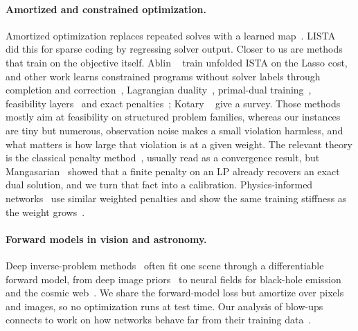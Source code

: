 \paragraph{Amortized and constrained optimization.}
Amortized optimization replaces repeated solves with a learned map~\cite{amos2023tutorial}. LISTA~\cite{gregor2010lista} did this for sparse coding by regressing solver output. Closer to us are methods that train on the objective itself. Ablin \etal~\cite{ablin2019unfolded} train unfolded ISTA on the Lasso cost, and other work learns constrained programs without solver labels through completion and correction~\cite{donti2021dc3}, Lagrangian duality~\cite{fioretto2020lagrangian}, primal-dual training~\cite{park2023primal}, feasibility layers~\cite{chen2024e2elr} and exact penalties~\cite{benslimane2025penalty}; Kotary \etal~\cite{kotary2021survey} give a survey. Those methods mostly aim at feasibility on structured problem families, whereas our instances are tiny but numerous, observation noise makes a small violation harmless, and what matters is how large that violation is at a given weight. The relevant theory is the classical penalty method~\cite{courant1943variational,fiacco1968nonlinear,nocedal2006numerical}, usually read as a convergence result, but Mangasarian~\cite{mangasarian2004newton} showed that a finite penalty on an LP already recovers an exact dual solution, and we turn that fact into a calibration. Physics-informed networks~\cite{raissi2019pinn} use similar weighted penalties and show the same training stiffness as the weight grows~\cite{wang2021pathologies,krishnapriyan2021failure}.

\paragraph{Forward models in vision and astronomy.}
Deep inverse-problem methods~\cite{ongie2020inverse} often fit one scene through a differentiable forward model, from deep image priors~\cite{ulyanov2018dip} to neural fields for black-hole emission~\cite{levis2022bhnerf,feng2026pidef} and the cosmic web~\cite{zhao2025cosmic}. We share the forward-model loss but amortize over pixels and images, so no optimization runs at test time. Our analysis of blow-ups connects to work on how networks behave far from their training data~\cite{hein2019relu,xu2021extrapolate}.
